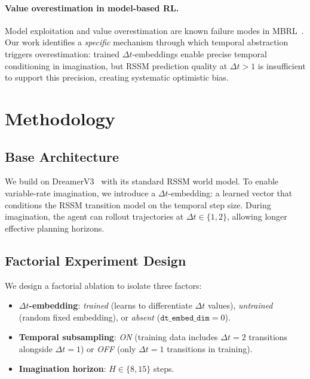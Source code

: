 \documentclass[10pt,letterpaper]{article}
\begin{document}
\paragraph{Value overestimation in model-based RL.}
Model exploitation and value overestimation are known failure modes in MBRL~\citep{janner2019trust,lu2018non}. Our work identifies a \emph{specific} mechanism through which temporal abstraction triggers overestimation: trained $\Delta t$-embeddings enable precise temporal conditioning in imagination, but RSSM prediction quality at $\Delta t{>}1$ is insufficient to support this precision, creating systematic optimistic bias.

\section{Methodology}
\label{sec:method}

\subsection{Base Architecture}

We build on DreamerV3~\citep{hafner2023mastering} with its standard RSSM world model. To enable variable-rate imagination, we introduce a $\Delta t$-embedding: a learned vector that conditions the RSSM transition model on the temporal step size. During imagination, the agent can rollout trajectories at $\Delta t \in \{1, 2\}$, allowing longer effective planning horizons.

\subsection{Factorial Experiment Design}

We design a factorial ablation to isolate three factors:

\begin{itemize}
    \item \textbf{$\Delta t$-embedding}: \emph{trained} (learns to differentiate $\Delta t$ values), \emph{untrained} (random fixed embedding), or \emph{absent} ($\texttt{dt\_embed\_dim}{=}0$).
    \item \textbf{Temporal subsampling}: \emph{ON} (training data includes $\Delta t{=}2$ transitions alongside $\Delta t{=}1$) or \emph{OFF} (only $\Delta t{=}1$ transitions in training).
    \item \textbf{Imagination horizon}: $H \in \{8, 15\}$ steps.
\end{itemize}
\end{document}
